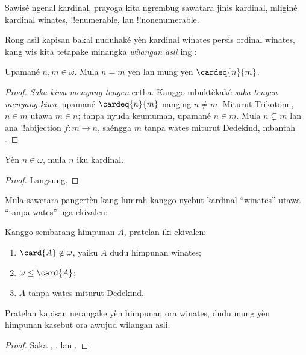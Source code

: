 \documentclass[../../../include/open-logic-section]{subfiles}
\begin{document}

Sawisé ngenal kardinal, prayoga kita ngrembug sawatara jinis
kardinal, mliginé kardinal winates, !!{enumerable}, lan
!!{nonenumerable}.

Rong asil kapisan bakal nuduhaké yèn kardinal winates persis
ordinal winates, kang wis kita tetapake minangka
\emph{wilangan asli} ing
:

\begin{prop}
Upamané $n, m \in \omega$. Mula $n = m$ yen lan mung yen $\cardeq{n}{m}$.
\end{prop}

\begin{proof}
\emph{Saka kiwa menyang tengen} cetha. Kanggo mbuktèkaké
\emph{saka tengen menyang kiwa}, upamané $\cardeq{n}{m}$
nanging $n \neq m$. Miturut Trikotomi, $n
\in m$ utawa $m \in n$; tanpa nyuda keumuman, upamané $n \in m$.
Mula $n \subsetneq m$ lan ana !!a{bijection} $f \colon m \to n$,
saéngga $m$ tanpa wates miturut Dedekind, mbantah
.
\end{proof}

\begin{cor}
Yèn $n \in \omega$, mula $n$ iku kardinal.
\end{cor}

\begin{proof}
Langsung.
\end{proof}
\noindent
Mula sawetara pangertèn kang lumrah kanggo nyebut kardinal
“winates” utawa “tanpa wates” uga ekivalen:
\begin{thm}Kanggo sembarang himpunan $A$, pratelan iki ekivalen:
\begin{enumerate}
	\item{} $\card{A} \notin \omega$, yaiku
	$A$ dudu himpunan winates;
	\item{} $\omega \leq \card{A}$;
	\item{} $A$ tanpa wates miturut Dedekind.
\end{enumerate}
\end{thm}
Pratelan kapisan nerangake yèn himpunan ora winates, dudu mung yèn himpunan kasebut ora awujud wilangan asli.

\begin{proof}
Saka ,
, lan
.
\end{proof}
\end{document}
